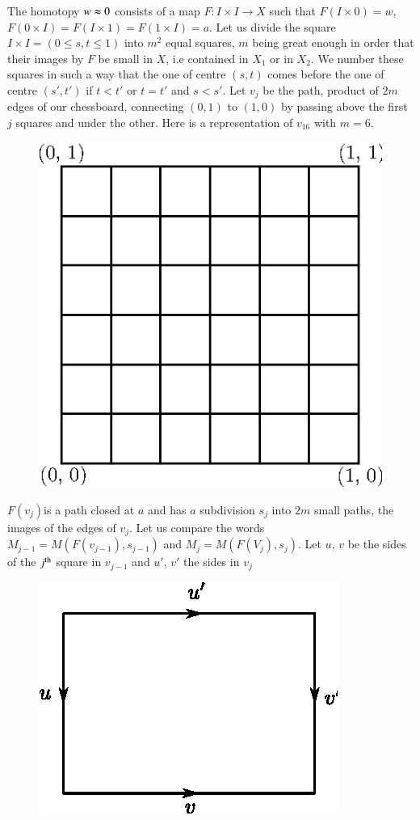 The homotopy $w \thickapprox 0$ consists of a map $F: I\times I \to X$
such that $F(I \times 0) = w$, $F(0 \times I) =  F(I \times 1) = F(1
\times I) =a$. Let us divide the square $I \times I = ( 0 \le s, t \le
1)$ into $m^2$ equal squares, $m$ being great enough in order that
their images by $F$ be small in $X$, i.e contained in $X_1$ or in
$X_2$. We number these squares in such a way that the one of centre
$(s,t)$ comes before the one of centre $(s', t') $ if $t < t'$ or
$t=t'$ and $s < s'$. Let $v_j$ be the path, product of $2m$ edges of
our chessboard, connecting $(0,1)$ to $(1,0)$ by passing above the
first $j$ squares and under the other. Here is a representation of
$v_{16}$ with $m=6$. 
\begin{figure}[H]
\centering
\includegraphics{vol44-fig/fig44-3.eps}
\end{figure}
$F(v_j)$\pageoriginale is a path closed at $a$ and has $a$ subdivision
$s_j$ into $2m$ small paths, the images of the edges of $v_j$. Let us
compare the words $M_{j-1} = M(F(v_{j-1}),  s_{j-1})$ and $M_j=
M(F(V_j), s_j)$. Let $u$, $v$ be the sides of the $j^{\rm th}$ square in
$v_{j-1}$ and $u'$, $v'$ the sides in $v_j$  
\begin{figure}[H]
\centering
\includegraphics{vol44-fig/fig44-4.eps}
\end{figure}

